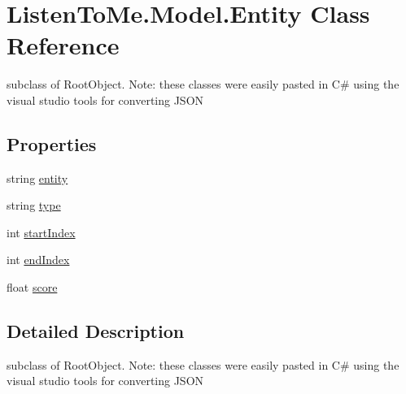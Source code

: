 \hypertarget{class_listen_to_me_1_1_model_1_1_entity}{}\section{Listen\+To\+Me.\+Model.\+Entity Class Reference}
\label{class_listen_to_me_1_1_model_1_1_entity}


subclass of Root\+Object. Note\+: these classes were easily pasted in C\# using the visual studio tools for converting J\+S\+ON  


\subsection*{Properties}
\begin{DoxyCompactItemize}
\item 
string \mbox{\hyperlink{class_listen_to_me_1_1_model_1_1_entity_a4ae17435557f0e0ec97ff0a93f791f63}{entity}}
\item 
string \mbox{\hyperlink{class_listen_to_me_1_1_model_1_1_entity_af2daeab3bb0f1ec71b0664aad418ac65}{type}}
\item 
int \mbox{\hyperlink{class_listen_to_me_1_1_model_1_1_entity_a32c85bf1ead96ed642a8164fb425c274}{start\+Index}}
\item 
int \mbox{\hyperlink{class_listen_to_me_1_1_model_1_1_entity_ab4fe7e4a09235bbf2715a3049cba3efb}{end\+Index}}
\item 
float \mbox{\hyperlink{class_listen_to_me_1_1_model_1_1_entity_aed4873738d141be126a637073cae179a}{score}}
\end{DoxyCompactItemize}


\subsection{Detailed Description}
subclass of Root\+Object. Note\+: these classes were easily pasted in C\# using the visual studio tools for converting J\+S\+ON 



